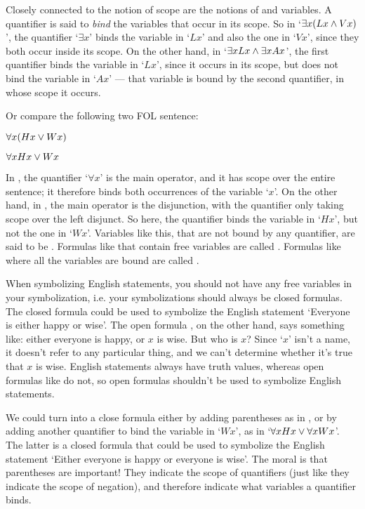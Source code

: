 Closely connected to the notion of scope are the notions of  and  variables.  A quantifier is said to \emph{bind} the variables that occur in its scope.  So in `$\exists x(Lx \wedge Vx)$', the quantifier `$\exists x$' binds the variable in `$Lx$' and also the one in `$Vx$', since they both occur inside its scope.  On the other hand, in `$\exists xLx \wedge \exists xAx$', the first quantifier binds the variable in `$Lx$', since it occurs in its scope, but does not bind the variable in `$Ax$'  --- that variable is bound by the second quantifier, in whose scope it occurs.

Or compare the following two FOL sentence:

	\begin{earg}
		\item[\ex{bound1}] $\forall x(Hx \vee Wx)$
		\item[\ex{bound2}] $\forall xHx \vee Wx$
	\end{earg}
In , the quantifier `$\forall x$' is the main operator, and it has scope over the entire sentence; it therefore binds both occurrences of the variable `$x$'.  On the other hand, in , the main operator is the disjunction, with the quantifier only taking scope over the left disjunct.  So here, the quantifier binds the variable in `$Hx$', but not the one in `$Wx$'.  Variables like this, that are not bound by any quantifier, are said to be .  Formulas like  that contain free variables are called .  Formulas like  where all the variables are bound are called .

When symbolizing English statements, you should not have any free variables in your symbolization, i.e. your symbolizations should always be closed formulas. The closed formula  could be used to symbolize the English statement `Everyone is either happy or wise'.  The open formula , on the other hand, says something like: either everyone is happy, or $x$ is wise.  But who is $x$?  Since `$x$' isn't a name, it doesn't refer to any particular thing, and we can't determine whether it's true that $x$ is wise.   English statements always have truth values, whereas open formulas like  do not, so open formulas shouldn't be used to symbolize English statements.

We could turn  into a close formula either by adding parentheses as in , or by adding another quantifier to bind the variable in `$Wx$', as in `$\forall x Hx \vee \forall xWx$'.  The latter is  a closed formula that could be used to symbolize the English statement `Either everyone is happy or everyone is wise'.  The moral is that parentheses are important! They indicate the scope of quantifiers (just like they indicate the scope of negation), and therefore indicate what variables a quantifier binds.

